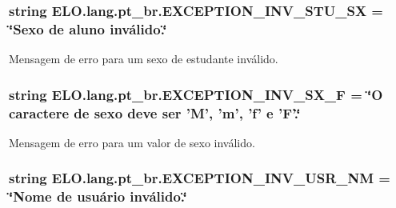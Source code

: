 \hypertarget{namespaceELO_1_1lang_1_1pt__br_a040f9c2a2d61c951632c35b17e24f63e}{
\subsubsection[{E\-X\-C\-E\-P\-T\-I\-O\-N\-\_\-\-I\-N\-V\-\_\-\-S\-T\-U\-\_\-\-S\-X}]{\setlength{\rightskip}{0pt plus 5cm}string E\-L\-O.\-lang.\-pt\-\_\-br.\-E\-X\-C\-E\-P\-T\-I\-O\-N\-\_\-\-I\-N\-V\-\_\-\-S\-T\-U\-\_\-\-S\-X = \char`\"{}Sexo de aluno inválido.\char`\"{}}}\label{d5/d70/namespaceELO_1_1lang_1_1pt__br_a040f9c2a2d61c951632c35b17e24f63e}


Mensagem de erro para um sexo de estudante inválido. 

\hypertarget{namespaceELO_1_1lang_1_1pt__br_aef1ca456be5da2eb76813d8fe3e16a77}{
\subsubsection[{E\-X\-C\-E\-P\-T\-I\-O\-N\-\_\-\-I\-N\-V\-\_\-\-S\-X\-\_\-\-F}]{\setlength{\rightskip}{0pt plus 5cm}string E\-L\-O.\-lang.\-pt\-\_\-br.\-E\-X\-C\-E\-P\-T\-I\-O\-N\-\_\-\-I\-N\-V\-\_\-\-S\-X\-\_\-\-F = \char`\"{}O caractere de sexo deve ser 'M', 'm', 'f' e 'F'.\char`\"{}}}\label{d5/d70/namespaceELO_1_1lang_1_1pt__br_aef1ca456be5da2eb76813d8fe3e16a77}


Mensagem de erro para um valor de sexo inválido. 

\hypertarget{namespaceELO_1_1lang_1_1pt__br_a7c76b59cd9101852b40dccfac9cd8a1e}{
\subsubsection[{E\-X\-C\-E\-P\-T\-I\-O\-N\-\_\-\-I\-N\-V\-\_\-\-U\-S\-R\-\_\-\-N\-M}]{\setlength{\rightskip}{0pt plus 5cm}string E\-L\-O.\-lang.\-pt\-\_\-br.\-E\-X\-C\-E\-P\-T\-I\-O\-N\-\_\-\-I\-N\-V\-\_\-\-U\-S\-R\-\_\-\-N\-M = \char`\"{}Nome de usuário inválido.\char`\"{}}}\label{d5/d70/namespaceELO_1_1lang_1_1pt__br_a7c76b59cd9101852b40dccfac9cd8a1e}


